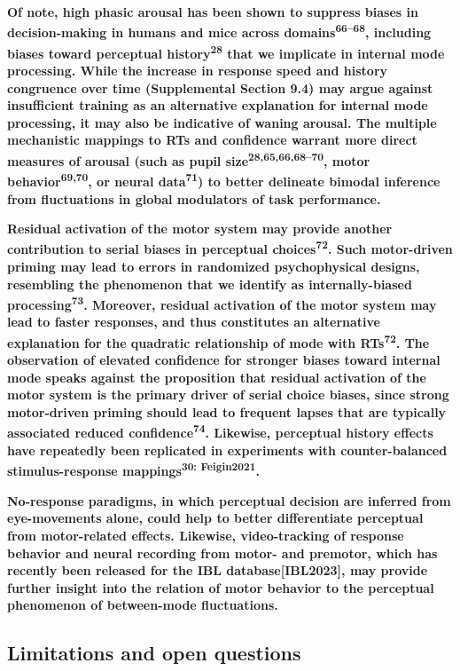 \documentclass[
]{article}
\begin{document}
\textbf{Of note, high phasic arousal has been shown to suppress biases
in decision-making in humans and mice across
domains\textsuperscript{66--68}, including biases toward perceptual
history\textsuperscript{28} that we implicate in internal mode
processing. While the increase in response speed and history congruence
over time (Supplemental Section 9.4) may argue against insufficient
training as an alternative explanation for internal mode processing, it
may also be indicative of waning arousal. The multiple mechanistic
mappings to RTs and confidence warrant more direct measures of arousal
(such as pupil size\textsuperscript{28,65,66,68--70}, motor
behavior\textsuperscript{69,70}, or neural data\textsuperscript{71}) to
better delineate bimodal inference from fluctuations in global
modulators of task performance.}

\textbf{Residual activation of the motor system may provide another
contribution to serial biases in perceptual choices\textsuperscript{72}.
Such motor-driven priming may lead to errors in randomized
psychophysical designs, resembling the phenomenon that we identify as
internally-biased processing\textsuperscript{73}. Moreover, residual
activation of the motor system may lead to faster responses, and thus
constitutes an alternative explanation for the quadratic relationship of
mode with RTs\textsuperscript{72}. The observation of elevated
confidence for stronger biases toward internal mode speaks against the
proposition that residual activation of the motor system is the primary
driver of serial choice biases, since strong motor-driven priming should
lead to frequent lapses that are typically associated reduced
confidence\textsuperscript{74}. Likewise, perceptual history effects
have repeatedly been replicated in experiments with counter-balanced
stimulus-response mappings\textsuperscript{30: Feigin2021}.}

\textbf{No-response paradigms, in which perceptual decision are inferred
from eye-movements alone, could help to better differentiate perceptual
from motor-related effects. Likewise, video-tracking of response
behavior and neural recording from motor- and premotor, which has
recently been released for the IBL database{[}IBL2023{]}, may provide
further insight into the relation of motor behavior to the perceptual
phenomenon of between-mode fluctuations.}

\hypertarget{limitations-and-open-questions}{%
\subsection{Limitations and open
questions}\label{limitations-and-open-questions}}
\end{document}
